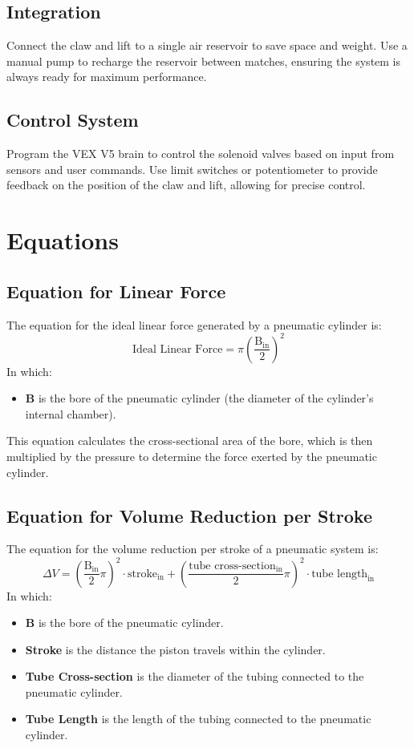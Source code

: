 \subsection*{Integration}
Connect the claw and lift to a single air reservoir to save space and weight. Use a manual pump to recharge the reservoir between matches, ensuring the system is always ready for maximum performance.

\subsection*{Control System}
Program the VEX V5 brain to control the solenoid valves based on input from sensors and user commands. Use limit switches or potentiometer to provide feedback on the position of the claw and lift, allowing for precise control.

\section*{Equations}

\subsection*{Equation for Linear Force}
The equation for the ideal linear force generated by a pneumatic cylinder is:
\[
\text{Ideal Linear Force} = \pi \left( \frac{\text{B}_\text{in}}{2} \right)^2
\]
In which:
\begin{itemize}
    \item \textbf{B} is the bore of the pneumatic cylinder (the diameter of the cylinder's internal chamber).
\end{itemize}

This equation calculates the cross-sectional area of the bore, which is then multiplied by the pressure to determine the force exerted by the pneumatic cylinder.

\subsection*{Equation for Volume Reduction per Stroke}
The equation for the volume reduction per stroke of a pneumatic system is:
\[
\Delta V = \left(\frac{\text{B}_\text{in}}{2}\pi \right)^2 \cdot \text{stroke}_\text{in} + \left(\frac{\text{tube cross-section}_\text{in}}{2}\pi \right)^2 \cdot \text{tube length}_\text{in}
\]
In which:
\begin{itemize}
    \item \textbf{B} is the bore of the pneumatic cylinder.
    \item \textbf{Stroke} is the distance the piston travels within the cylinder.
    \item \textbf{Tube Cross-section} is the diameter of the tubing connected to the pneumatic cylinder.
    \item \textbf{Tube Length} is the length of the tubing connected to the pneumatic cylinder.
\end{itemize}

